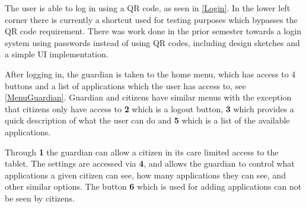 The user is able to log in using a QR code, as seen in \autoref{Login}. In the
lower left corner there is currently a shortcut used for testing purposes which
bypasses the QR code requirement. There was work done in the prior semester
towards a login system using passwords instead of using QR codes, including
design sketches and a simple UI implementation.


After logging in, the guardian is taken to the home menu, which has access to 4
buttons and a list of applications which the user has access to,
see \autoref{MenuGuardian}. Guardian and citizens have similar menus with
the exception that citizens only have access to \textbf{2} which is a logout button,
\textbf{3} which provides a quick description of what the user can do and
\textbf{5} which is a list of the available applications.


Through \textbf{1} the guardian can allow a citizen in its care limited access
to the tablet. The settings are accessed via \textbf{4}, and allows the
guardian to control what applications a given citizen can see, how many
applications they can see, and other similar options. The button \textbf{6}
which is used for adding applications can not be seen by citizens.


% 
% 
% 
% 
% 

